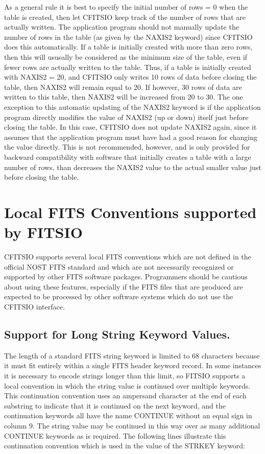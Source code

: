 \documentclass[11pt]{book}
\begin{document}
As a general rule it is best to specify the initial number of rows = 0
when the table is created, then let CFITSIO keep track of the number of
rows that are actually written.  The application program should not
manually update the number of rows in the table (as given by the NAXIS2
keyword) since CFITSIO does this automatically.  If a table is
initially created with more than zero rows, then this will ususally be
considered as the minimum size of the table, even if fewer rows are
actually written to the table.  Thus, if a table is initially created
with NAXIS2 = 20, and CFITSIO only writes 10 rows of data before
closing the table, then NAXIS2 will remain equal to 20.  If however, 30
rows of data are written to this table, then NAXIS2 will be increased
from 20 to 30.  The one exception to this automatic updating of the
NAXIS2 keyword is if the application program directly modifies the
value of NAXIS2 (up or down) itself just before closing the table.  In this
case, CFITSIO does not update NAXIS2 again, since it assumes that the
application program must have had a good reason for changing the value
directly.  This is not recommended, however, and is only provided for
backward compatibility with software that initially creates a table
with a large number of rows, than decreases the NAXIS2 value to the
actual smaller value just before closing the table.


\section{Local FITS Conventions supported by FITSIO}

CFITSIO supports several local FITS conventions which are not
defined in the official NOST FITS standard and which are not
necessarily recognized or supported by other FITS software packages.
Programmers should be cautious about using these features, especially
if the FITS files that are produced are expected to be processed by
other software systems which do not use the CFITSIO interface.


\subsection{Support for Long String Keyword Values.}

The length of a standard FITS string keyword is limited to 68
characters because it must fit entirely within a single FITS header
keyword record.  In some instances it is necessary to encode strings
longer than this limit, so FITSIO supports a local convention in which
the string value is continued over multiple keywords. This
continuation convention uses an ampersand character at the end of each
substring to indicate that it is continued on the next keyword, and the
continuation keywords all have the name CONTINUE without an equal sign
in column 9. The string value may be continued in this way over as many
additional CONTINUE keywords as is required.  The following lines
illustrate this continuation convention which is used in the value of
the STRKEY keyword:
\end{document}

